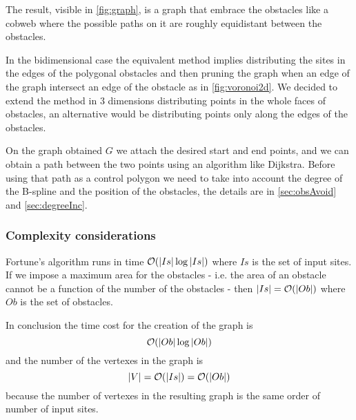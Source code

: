 \documentclass[dissertation.tex]{subfiles}
\begin{document}
The result, visible in \cref{fig:graph}, is a graph that embrace the
obstacles like a cobweb where the possible paths on it are roughly
equidistant between the obstacles.

In the bidimensional case the equivalent method implies distributing
the sites in the edges of the polygonal obstacles and then pruning the
graph when an edge of the graph intersect an edge of the obstacle as
in \cref{fig:voronoi2d}.
We decided to extend the method in 3 dimensions distributing points in
the whole faces of obstacles, an alternative would be distributing
points only along the edges of the obstacles.

On the graph obtained $G$ we attach the desired start and end
points, and we can obtain a path between the two points using an
algorithm like Dijkstra. Before using that path as a control polygon
we need to take into account the degree of the B-spline and the
position of the obstacles, the details are in \cref{sec:obsAvoid} and
\cref{sec:degreeInc}.

\subsubsection{Complexity considerations}
Fortune's algorithm runs in time $\mathcal{O}(|Is|\log |Is|)$ where $Is$ is
the set 
of input sites. If we impose a maximum area for the obstacles -
i.e. the area of an obstacle cannot be a function of the number of
the obstacles - then $|Is|=\mathcal{O}(|Ob|)$ where $Ob$ is the set of
obstacles.

In conclusion the time cost for the creation of the graph
is
\begin{equation}
  \label{eq:costGraph}
  \mathcal{O}(|Ob|\log |Ob|)
\end{equation}
and the number of the vertexes in the graph
is 
\begin{equation}
  \label{eq:numV}
  |V|=\mathcal{O}(|Is|)=\mathcal{O}(|Ob|)
\end{equation}
because the number of vertexes in the resulting graph is the
same order of number of input sites.
\end{document}
